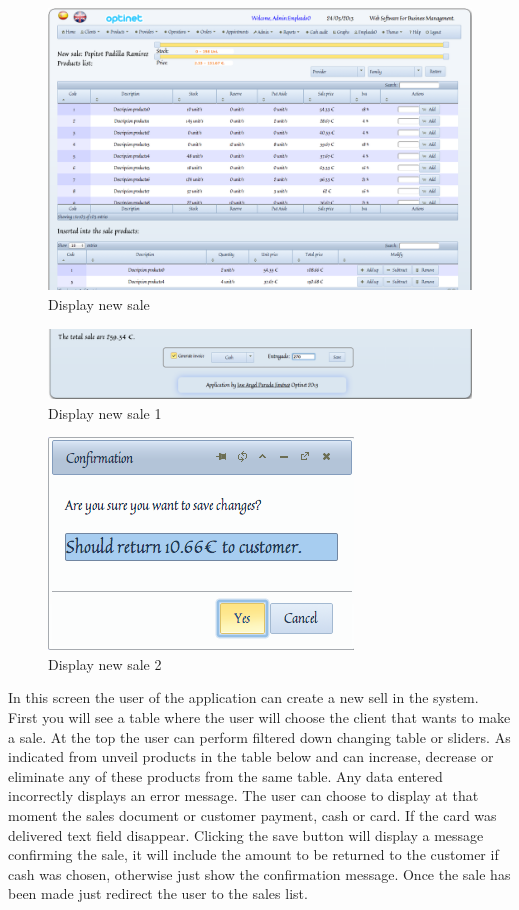 \documentclass[a4paper,11pt]{book}
\begin{document}
\begin{figure}[!htb]
  \centering
    \includegraphics[scale=0.35]{icapnuevaventa.png}
  \caption{Display new sale}
  \label{a}
\end{figure}

\begin{figure}[!htb]
  \centering
    \includegraphics[scale=0.35]{icapnuevaventa1.png}
  \caption{Display new sale 1}
  \label{a}
\end{figure}

\begin{figure}[!htb]
  \centering
    \includegraphics[scale=0.35]{icapnuevaventa2.png}
  \caption{Display new sale 2}
  \label{a}
\end{figure}

In this screen the user of the application can create a new sell in the system. First you will see a table where the user will choose the client that wants to make a sale. At the top the user can perform filtered down changing table or sliders. As indicated from unveil products in the table below and can increase, decrease or eliminate any of these products from the same table. Any data entered incorrectly displays an error message. The user can choose to display at that moment the sales document or customer payment, cash or card. If the card was delivered text field disappear. Clicking the save button will display a message confirming the sale, it will include the amount to be returned to the customer if cash was chosen, otherwise just show the confirmation message. Once the sale has been made just redirect the user to the sales list.
\end{document}
